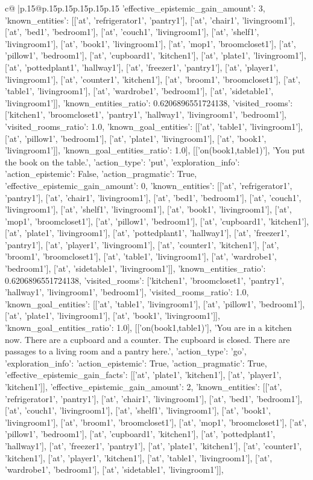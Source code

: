 \documentclass{article}
\begin{document}
{\begin{supertabular}{c@{$\;$}|p{.15\linewidth}@{}p{.15\linewidth}p{.15\linewidth}p{.15\linewidth}p{.15\linewidth}p{.15\linewidth}}
{{{'effective_epistemic_gain_amount': 3, 'known_entities': [['at', 'refrigerator1', 'pantry1'], ['at', 'chair1', 'livingroom1'], ['at', 'bed1', 'bedroom1'], ['at', 'couch1', 'livingroom1'], ['at', 'shelf1', 'livingroom1'], ['at', 'book1', 'livingroom1'], ['at', 'mop1', 'broomcloset1'], ['at', 'pillow1', 'bedroom1'], ['at', 'cupboard1', 'kitchen1'], ['at', 'plate1', 'livingroom1'], ['at', 'pottedplant1', 'hallway1'], ['at', 'freezer1', 'pantry1'], ['at', 'player1', 'livingroom1'], ['at', 'counter1', 'kitchen1'], ['at', 'broom1', 'broomcloset1'], ['at', 'table1', 'livingroom1'], ['at', 'wardrobe1', 'bedroom1'], ['at', 'sidetable1', 'livingroom1']], 'known_entities_ratio': 0.6206896551724138, 'visited_rooms': ['kitchen1', 'broomcloset1', 'pantry1', 'hallway1', 'livingroom1', 'bedroom1'], 'visited_rooms_ratio': 1.0, 'known_goal_entities': [['at', 'table1', 'livingroom1'], ['at', 'pillow1', 'bedroom1'], ['at', 'plate1', 'livingroom1'], ['at', 'book1', 'livingroom1']], 'known_goal_entities_ratio': 1.0}}], [['on(book1,table1)'], 'You put the book on the table.', {'action_type': 'put', 'exploration_info': {'action_epistemic': False, 'action_pragmatic': True, 'effective_epistemic_gain_amount': 0, 'known_entities': [['at', 'refrigerator1', 'pantry1'], ['at', 'chair1', 'livingroom1'], ['at', 'bed1', 'bedroom1'], ['at', 'couch1', 'livingroom1'], ['at', 'shelf1', 'livingroom1'], ['at', 'book1', 'livingroom1'], ['at', 'mop1', 'broomcloset1'], ['at', 'pillow1', 'bedroom1'], ['at', 'cupboard1', 'kitchen1'], ['at', 'plate1', 'livingroom1'], ['at', 'pottedplant1', 'hallway1'], ['at', 'freezer1', 'pantry1'], ['at', 'player1', 'livingroom1'], ['at', 'counter1', 'kitchen1'], ['at', 'broom1', 'broomcloset1'], ['at', 'table1', 'livingroom1'], ['at', 'wardrobe1', 'bedroom1'], ['at', 'sidetable1', 'livingroom1']], 'known_entities_ratio': 0.6206896551724138, 'visited_rooms': ['kitchen1', 'broomcloset1', 'pantry1', 'hallway1', 'livingroom1', 'bedroom1'], 'visited_rooms_ratio': 1.0, 'known_goal_entities': [['at', 'table1', 'livingroom1'], ['at', 'pillow1', 'bedroom1'], ['at', 'plate1', 'livingroom1'], ['at', 'book1', 'livingroom1']], 'known_goal_entities_ratio': 1.0}}], [['on(book1,table1)'], 'You are in a kitchen now. There are a cupboard and a counter. The cupboard is closed. There are passages to a living room and a pantry here.', {'action_type': 'go', 'exploration_info': {'action_epistemic': True, 'action_pragmatic': True, 'effective_epistemic_gain_facts': [['at', 'plate1', 'kitchen1'], ['at', 'player1', 'kitchen1']], 'effective_epistemic_gain_amount': 2, 'known_entities': [['at', 'refrigerator1', 'pantry1'], ['at', 'chair1', 'livingroom1'], ['at', 'bed1', 'bedroom1'], ['at', 'couch1', 'livingroom1'], ['at', 'shelf1', 'livingroom1'], ['at', 'book1', 'livingroom1'], ['at', 'broom1', 'broomcloset1'], ['at', 'mop1', 'broomcloset1'], ['at', 'pillow1', 'bedroom1'], ['at', 'cupboard1', 'kitchen1'], ['at', 'pottedplant1', 'hallway1'], ['at', 'freezer1', 'pantry1'], ['at', 'plate1', 'kitchen1'], ['at', 'counter1', 'kitchen1'], ['at', 'player1', 'kitchen1'], ['at', 'table1', 'livingroom1'], ['at', 'wardrobe1', 'bedroom1'], ['at', 'sidetable1', 'livingroom1']], }}}
\end{supertabular}}
\end{document}
